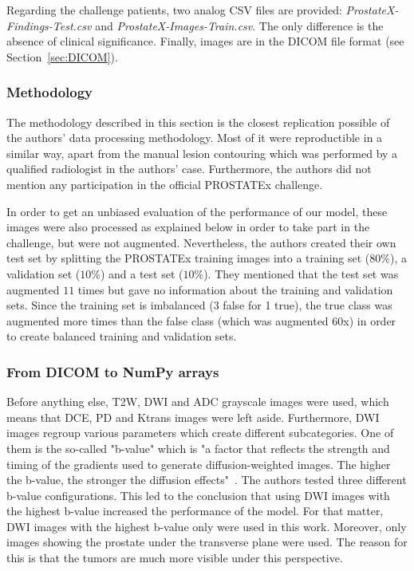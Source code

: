 \noindent Regarding the challenge patients, two analog CSV files are provided: \textit{ProstateX-Findings-Test.csv} and \textit{ProstateX-Images-Train.csv}. The only difference is the absence of clinical significance. Finally, images are in the DICOM file format (see \mbox{Section \ref{sec:DICOM}}). 


\subsubsection{Methodology}
\setlength{\marginparwidth}{3cm}\leavevmode {}The methodology described in this section is the closest replication possible of the authors' data processing methodology. Most of it were reproductible in a similar way, apart from the manual lesion contouring which was performed by a qualified radiologist in the authors' case. Furthermore, the authors did not mention any participation in the official PROSTATEx challenge.

In order to get an unbiased evaluation of the performance of our model, these images were also processed as explained below in order to take part in the challenge, but were not augmented. Nevertheless, the authors created their own test set by splitting the PROSTATEx training images into a training set ($80\%$), a validation set ($10\%$) and a test set ($10\%$). They mentioned that the test set was augmented $11$ times but gave no information about the training and validation sets. Since the training set is imbalanced (3 false for 1 true), the true class was augmented more times than the false class (which was augmented $60$x) in order to create balanced training and validation sets. 


\subsubsection{From DICOM to NumPy arrays}
\label{sec:DICOMtoNumPy}
\setlength{\marginparwidth}{3cm}\leavevmode {}Before anything else, T2W, DWI and ADC grayscale images were used, which means that DCE, PD and Ktrans images were left aside. Furthermore, DWI images regroup various parameters which create different subcategories. One of them is the so-called "b-value" which is "a factor that reflects the strength and timing of the gradients used to generate diffusion-weighted images. The higher the b-value, the stronger the diffusion effects"~\cite{49}. The authors tested three different b-value configurations. This led to the conclusion that using DWI images with the highest b-value increased the performance of the model. For that matter, DWI images with the highest b-value only were used in this work. Moreover, only images showing the prostate under the transverse plane were used. The reason for this is that the tumors are much more visible under this perspective. 

